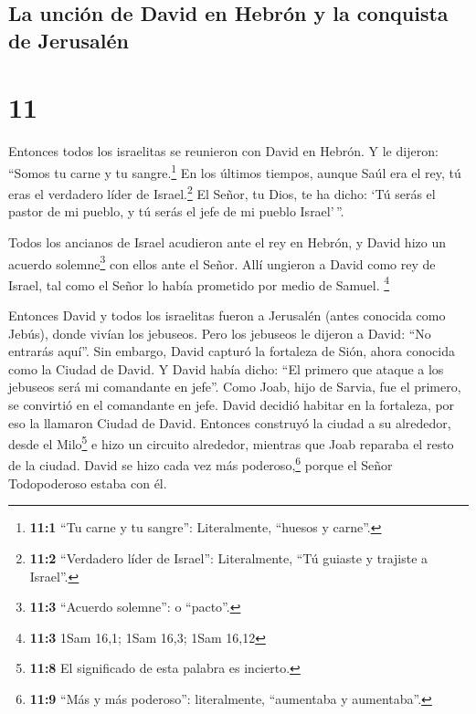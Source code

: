 \hypertarget{la-unciuxf3n-de-david-en-hebruxf3n-y-la-conquista-de-jerusaluxe9n}{%
\subsection{La unción de David en Hebrón y la conquista de
Jerusalén}\label{la-unciuxf3n-de-david-en-hebruxf3n-y-la-conquista-de-jerusaluxe9n}}

\hypertarget{section-10}{%
\section{11}\label{section-10}}

 Entonces todos los israelitas se reunieron con David en
Hebrón. Y le dijeron: ``Somos tu carne y tu sangre.\footnote{\textbf{11:1}
  ``Tu carne y tu sangre'': Literalmente, ``huesos y carne''.}
 En los últimos tiempos, aunque Saúl era el rey, tú eras
el verdadero líder de Israel.\footnote{\textbf{11:2} ``Verdadero líder
  de Israel'': Literalmente, ``Tú guiaste y trajiste a Israel''.} El
Señor, tu Dios, te ha dicho: `Tú serás el pastor de mi pueblo, y tú
serás el jefe de mi pueblo Israel'\,''.

 Todos los ancianos de Israel acudieron ante el rey en
Hebrón, y David hizo un acuerdo solemne\footnote{\textbf{11:3} ``Acuerdo
  solemne'': o ``pacto''.} con ellos ante el Señor. Allí ungieron a
David como rey de Israel, tal como el Señor lo había prometido por medio
de Samuel. \footnote{\textbf{11:3} 1Sam 16,1; 1Sam 16,3; 1Sam 16,12}

 Entonces David y todos los israelitas fueron a Jerusalén
(antes conocida como Jebús), donde vivían los jebuseos. 
Pero los jebuseos le dijeron a David: ``No entrarás aquí''. Sin embargo,
David capturó la fortaleza de Sión, ahora conocida como la Ciudad de
David.  Y David había dicho: ``El primero que ataque a los
jebuseos será mi comandante en jefe''. Como Joab, hijo de Sarvia, fue el
primero, se convirtió en el comandante en jefe.  David
decidió habitar en la fortaleza, por eso la llamaron Ciudad de David.
 Entonces construyó la ciudad a su alrededor, desde el
Milo\footnote{\textbf{11:8} El significado de esta palabra es incierto.}
e hizo un circuito alrededor, mientras que Joab reparaba el resto de la
ciudad.  David se hizo cada vez más poderoso,\footnote{\textbf{11:9}
  ``Más y más poderoso'': literalmente, ``aumentaba y aumentaba''.}
porque el Señor Todopoderoso estaba con él.

